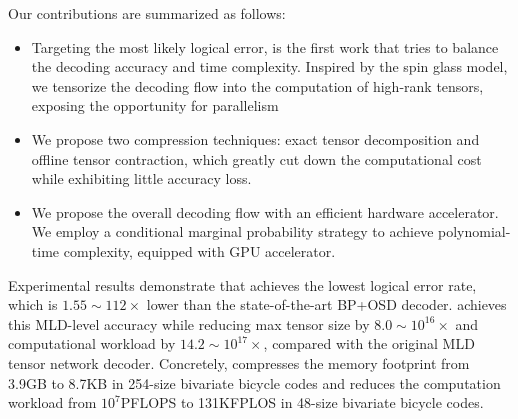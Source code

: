 Our contributions are summarized as follows:
\begin{itemize}
\item Targeting the most likely logical error, \papername is the first work that tries to balance the decoding accuracy and time complexity. Inspired by the spin glass model, we tensorize the decoding flow into the computation of high-rank tensors, exposing the opportunity for parallelism
\item We propose two compression techniques: exact tensor decomposition and offline tensor contraction, which greatly cut down the computational cost while exhibiting little accuracy loss. 
\item We propose the overall decoding flow with an efficient hardware accelerator. We employ a conditional marginal probability strategy to achieve polynomial-time complexity, equipped with GPU accelerator.
\end{itemize}

Experimental results demonstrate that \papername achieves the lowest logical error rate, which is $1.55\sim112\times$ lower than the state-of-the-art BP+OSD decoder. 
\papername achieves this MLD-level accuracy while reducing max tensor size by $8.0\sim 10^{16}\times$ and computational workload by $14.2\sim 10^{17}\times$, compared with the original MLD tensor network decoder. Concretely, \papername compresses the memory footprint from  3.9GB to 8.7KB in 254-size bivariate bicycle codes and reduces the computation workload from $10^7$PFLOPS to 131KFPLOS in 48-size bivariate bicycle codes.